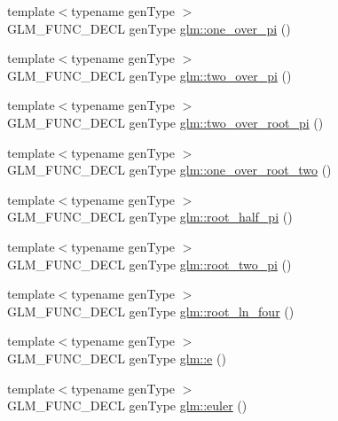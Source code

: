 \begin{DoxyCompactItemize}
\item 
{\footnotesize template$<$typename gen\-Type $>$ }\\G\-L\-M\-\_\-\-F\-U\-N\-C\-\_\-\-D\-E\-C\-L gen\-Type \hyperlink{group__gtc__constants_ga9ba09a027db6d4f4e259b01cf5d6c178}{glm\-::one\-\_\-over\-\_\-pi} ()
\item 
{\footnotesize template$<$typename gen\-Type $>$ }\\G\-L\-M\-\_\-\-F\-U\-N\-C\-\_\-\-D\-E\-C\-L gen\-Type \hyperlink{group__gtc__constants_ga85729d38c47351686e8659f80447a7ea}{glm\-::two\-\_\-over\-\_\-pi} ()
\item 
{\footnotesize template$<$typename gen\-Type $>$ }\\G\-L\-M\-\_\-\-F\-U\-N\-C\-\_\-\-D\-E\-C\-L gen\-Type \hyperlink{group__gtc__constants_ga767e539c20585bf60aa63595b0f0b259}{glm\-::two\-\_\-over\-\_\-root\-\_\-pi} ()
\item 
{\footnotesize template$<$typename gen\-Type $>$ }\\G\-L\-M\-\_\-\-F\-U\-N\-C\-\_\-\-D\-E\-C\-L gen\-Type \hyperlink{group__gtc__constants_gac1a9b3248357fd9e9b740bed90e0b1b7}{glm\-::one\-\_\-over\-\_\-root\-\_\-two} ()
\item 
{\footnotesize template$<$typename gen\-Type $>$ }\\G\-L\-M\-\_\-\-F\-U\-N\-C\-\_\-\-D\-E\-C\-L gen\-Type \hyperlink{group__gtc__constants_gaec5af85e2148c118aad7e797430fdeb0}{glm\-::root\-\_\-half\-\_\-pi} ()
\item 
{\footnotesize template$<$typename gen\-Type $>$ }\\G\-L\-M\-\_\-\-F\-U\-N\-C\-\_\-\-D\-E\-C\-L gen\-Type \hyperlink{group__gtc__constants_gae991b4d39c57b57990054eec3677597c}{glm\-::root\-\_\-two\-\_\-pi} ()
\item 
{\footnotesize template$<$typename gen\-Type $>$ }\\G\-L\-M\-\_\-\-F\-U\-N\-C\-\_\-\-D\-E\-C\-L gen\-Type \hyperlink{group__gtc__constants_ga9cae3fad9314e34c1d3aab71fcdef05f}{glm\-::root\-\_\-ln\-\_\-four} ()
\item 
{\footnotesize template$<$typename gen\-Type $>$ }\\G\-L\-M\-\_\-\-F\-U\-N\-C\-\_\-\-D\-E\-C\-L gen\-Type \hyperlink{group__gtc__constants_gab83fb6de0f05d6c0d11bdf0479f8319e}{glm\-::e} ()
\item 
{\footnotesize template$<$typename gen\-Type $>$ }\\G\-L\-M\-\_\-\-F\-U\-N\-C\-\_\-\-D\-E\-C\-L gen\-Type \hyperlink{group__gtc__constants_ga6f14b46653b7ead1edcbd0fc6c9c5289}{glm\-::euler} ()

\end{DoxyCompactItemize}
